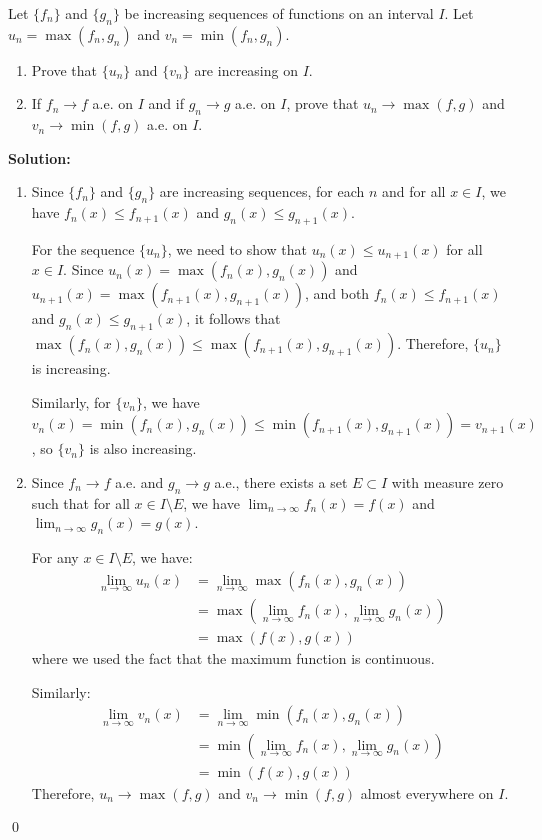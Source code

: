 \begin{problembox}
Let $\{f_n\}$ and $\{g_n\}$ be increasing sequences of functions on an interval $I$. Let $u_n = \max(f_n, g_n)$ and $v_n = \min(f_n, g_n)$.
\begin{enumerate}[label=(\alph*)]
    \item Prove that $\{u_n\}$ and $\{v_n\}$ are increasing on $I$.
    \item If $f_n \to f$ a.e. on $I$ and if $g_n \to g$ a.e. on $I$, prove that $u_n \to \max(f, g)$ and $v_n \to \min(f, g)$ a.e. on $I$.
\end{enumerate}
\end{problembox}

\bigskip\noindent\textbf{Solution:}
\begin{enumerate}[label=(\alph*)]
    \item Since $\{f_n\}$ and $\{g_n\}$ are increasing sequences, for each $n$ and for all $x \in I$, we have $f_n(x) \leq f_{n+1}(x)$ and $g_n(x) \leq g_{n+1}(x)$. 

    For the sequence $\{u_n\}$, we need to show that $u_n(x) \leq u_{n+1}(x)$ for all $x \in I$. Since $u_n(x) = \max(f_n(x), g_n(x))$ and $u_{n+1}(x) = \max(f_{n+1}(x), g_{n+1}(x))$, and both $f_n(x) \leq f_{n+1}(x)$ and $g_n(x) \leq g_{n+1}(x)$, it follows that $\max(f_n(x), g_n(x)) \leq \max(f_{n+1}(x), g_{n+1}(x))$. Therefore, $\{u_n\}$ is increasing.

    Similarly, for $\{v_n\}$, we have $v_n(x) = \min(f_n(x), g_n(x)) \leq \min(f_{n+1}(x), g_{n+1}(x)) = v_{n+1}(x)$, so $\{v_n\}$ is also increasing.

    \item Since $f_n \to f$ a.e. and $g_n \to g$ a.e., there exists a set $E \subset I$ with measure zero such that for all $x \in I \setminus E$, we have $\lim_{n \to \infty} f_n(x) = f(x)$ and $\lim_{n \to \infty} g_n(x) = g(x)$.

    For any $x \in I \setminus E$, we have:
    \begin{align*}
    \lim_{n \to \infty} u_n(x) &= \lim_{n \to \infty} \max(f_n(x), g_n(x)) \\
    &= \max(\lim_{n \to \infty} f_n(x), \lim_{n \to \infty} g_n(x)) \\
    &= \max(f(x), g(x))
    \end{align*}
    where we used the fact that the maximum function is continuous.

    Similarly:
    \begin{align*}
    \lim_{n \to \infty} v_n(x) &= \lim_{n \to \infty} \min(f_n(x), g_n(x)) \\
    &= \min(\lim_{n \to \infty} f_n(x), \lim_{n \to \infty} g_n(x)) \\
    &= \min(f(x), g(x))
    \end{align*}
    Therefore, $u_n \to \max(f, g)$ and $v_n \to \min(f, g)$ almost everywhere on $I$.
\end{enumerate}\qed


